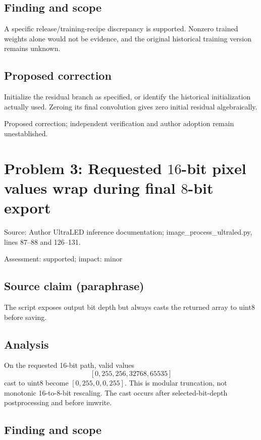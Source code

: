 \documentclass[11pt]{article}
\begin{document}
\subsection*{Finding and scope}

A specific release/training-recipe discrepancy is supported. Nonzero trained weights alone would not be evidence, and the original historical training version remains unknown.

\subsection*{Proposed correction}

Initialize the residual branch as specified, or identify the historical initialization actually used. Zeroing its final convolution gives zero initial residual algebraically.

Proposed correction; independent verification and author adoption remain unestablished.

\section*{Problem 3: Requested \(16\)-bit pixel values wrap during final \(8\)-bit export}

Source: Author UltraLED inference documentation; image\_process\_ultraled.py, lines 87–88 and 126–131.

Assessment: supported; impact: minor

\subsection*{Source claim (paraphrase)}

The script exposes output bit depth but always casts the returned array to uint8 before saving.

\subsection*{Analysis}

On the requested 16-bit path, valid values \[[0,255,256,32768,65535]\] cast to uint8 become \([0,255,0,0,255]\). This is modular truncation, not monotonic 16-to-8-bit rescaling. The cast occurs after selected-bit-depth postprocessing and before imwrite.

\subsection*{Finding and scope}
\end{document}
